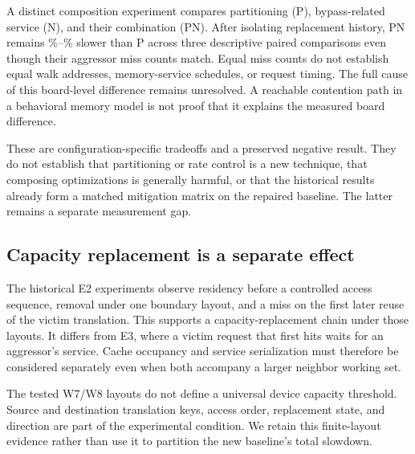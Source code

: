 A distinct composition experiment compares partitioning (P), bypass-related service (N), and their combination (PN). After isolating replacement history, PN remains \PNPenaltyMin\%--\PNPenaltyMax\% slower than P across three descriptive paired comparisons even though their aggressor miss counts match. Equal miss counts do not establish equal walk addresses, memory-service schedules, or request timing. The full cause of this board-level difference remains unresolved. A reachable contention path in a behavioral memory model is not proof that it explains the measured board difference.

These are configuration-specific tradeoffs and a preserved negative result. They do not establish that partitioning or rate control is a new technique, that composing optimizations is generally harmful, or that the historical results already form a matched mitigation matrix on the repaired baseline. The latter remains a separate measurement gap.

\subsection{Capacity replacement is a separate effect}

The historical E2 experiments observe residency before a controlled access sequence, removal under one boundary layout, and a miss on the first later reuse of the victim translation. This supports a capacity-replacement chain under those layouts. It differs from E3, where a victim request that first hits waits for an aggressor's service. Cache occupancy and service serialization must therefore be considered separately even when both accompany a larger neighbor working set.

The tested W7/W8 layouts do not define a universal device capacity threshold. Source and destination translation keys, access order, replacement state, and direction are part of the experimental condition. We retain this finite-layout evidence rather than use it to partition the new baseline's total slowdown.

